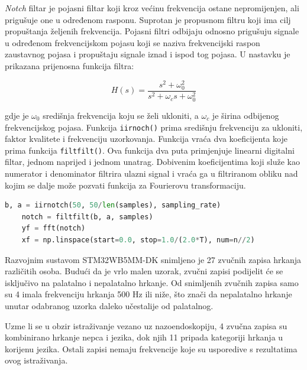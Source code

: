 \textit{Notch} filtar je pojasni filtar koji kroz većinu frekvencija ostane nepromijenjen, ali prigušuje one u određenom rasponu. Suprotan je propusnom filtru koji ima cilj propuštanja željenih frekvencija. Pojasni filtri odbijaju odnosno prigušuju signale u određenom frekvencijskom pojasu koji se naziva frekvencijski raspon zaustavnog pojasa i propuštaju signale iznad i ispod tog pojasa. \cite{notch} U nastavku je prikazana prijenosna funkcija filtra:

\begin{equation}
	H(s) = \dfrac{s^2 + \omega_0^2}{s^2 + \omega_c s + \omega_0^2}
\end{equation}

gdje je \(\omega_0\) središnja frekvencija koju se želi ukloniti, a \(\omega_c\) je širina odbijenog frekvencijskog pojasa.  Funkcija \lstinline|iirnoch()| prima središnju frekvenciju za ukloniti, faktor kvalitete i frekvenciju uzorkovanja. Funkcija vraća dva koeficijenta koje prima funkcija \lstinline|filtfilt()|. Ova funkcija dva puta primjenjuje linearni digitalni filtar, jednom naprijed i jednom unatrag. Dobivenim koeficijentima koji služe kao numerator i denominator filtrira ulazni signal i vraća ga u filtriranom obliku nad kojim se dalje može pozvati funkcija za Fourierovu transformaciju. \cite{scipy}

\begin{lstlisting}[language=Python, caption={Primjena \textit{notch} filtra i Fourierove transformacije}]
	b, a = iirnotch(50, 50/len(samples), sampling_rate)
	notch = filtfilt(b, a, samples)
	yf = fft(notch)
	xf = np.linspace(start=0.0, stop=1.0/(2.0*T), num=n//2)
\end{lstlisting}

Razvojnim sustavom STM32WB5MM-DK snimljeno je 27 zvučnih zapisa hrkanja različitih osoba. Budući da je vrlo malen uzorak, zvučni zapisi podijelit će se isključivo na palatalno i nepalatalno hrkanje. Od snimljenih zvučnih zapisa samo su 4 imala frekvenciju hrkanja 500 Hz ili niže, što znači da nepalatalno hrkanje unutar odabranog uzorka daleko učestalije od palatalnog.

Uzme li se u obzir istraživanje vezano uz nazoendoskopiju, 4 zvučna zapisa su kombinirano hrkanje nepca i jezika, dok njih 11 pripada kategoriji hrkanja u korijenu jezika. Ostali zapisi nemaju frekvencije koje su usporedive s rezultatima ovog istraživanja.